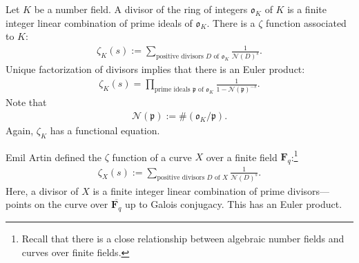 \documentclass [11 pt, oneside] {article}
\begin{document}
Let $K$ be a number field. A divisor of the ring of integers $\mathfrak{o}_K$ of $K$ is a finite integer linear combination of prime ideals of $\mathfrak{o}_K$. 
There is a $\zeta$ function associated to $K$:
\begin{align*}
	\zeta_K(s) :=  \sum_{\textrm{positive divisors $D$ of $\mathfrak{o}_K$}}^{}\frac{1}{\mathscr{N}(D)^s}. 
\end{align*}
Unique factorization of divisors implies that there is an Euler product:
\begin{align*}
	\zeta_K(s) = \prod_{\textrm{prime ideals $\mathfrak{p}$ of $\mathfrak{o}_K$}} \frac{1}{1-\mathscr{N}( \mathfrak{p}) ^{-s}}.
\end{align*}
Note that
\begin{align*}
	\mathscr{N}(\mathfrak{p}) := \#(\mathfrak{o}_K/\mathfrak{p}).
\end{align*}
Again, $\zeta_K$ has a functional equation.

Emil Artin defined the $\zeta$ function of a curve $X$ over a finite field $\mathbf{F}_{q}$:\footnote{Recall that there is a close relationship between algebraic number fields and curves over finite fields.}
\begin{align*}
	\zeta_X(s) :=  \sum_{\textrm{positive divisors $D$ of $X$}}^{} \frac{1}{\mathscr{N}(D) ^s}.
\end{align*}
Here, a divisor of $X$ is a finite integer linear combination of prime divisors---points on the curve over $\overline{\mathbf{F}_{q}}$ up to Galois conjugacy.
This has an Euler product.
\end{document}

